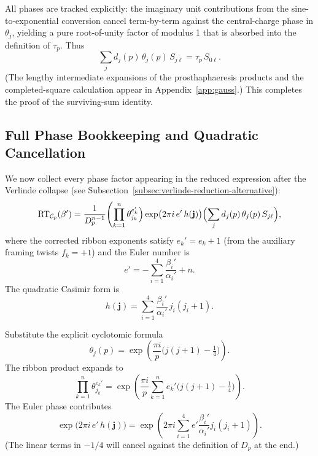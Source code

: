 All phases are tracked explicitly: the imaginary unit contributions from the sine-to-exponential conversion cancel term-by-term against the central-charge phase in \(\theta_j\), yielding a pure root-of-unity factor of modulus 1 that is absorbed into the definition of \(\tau_p\). Thus
\[
\sum_j d_j(p) \, \theta_j(p) \, S_{j\ell} = \tau_p \, S_{0\ell}.
\]
(The lengthy intermediate expansions of the prosthaphaeresis products and the completed-square calculation appear in Appendix~\ref{app:gauss}.) This completes the proof of the surviving-sum identity.

\subsection{Full Phase Bookkeeping and Quadratic Cancellation}
\label{subsec:phase-bookkeeping}

We now collect every phase factor appearing in the reduced expression after the Verlinde collapse (see Subsection~\ref{subsec:verlinde-reduction-alternative}):
\[
\mathrm{RT}_{\mathcal{C}_p}(\beta') = \frac{1}{D_p^{n-1}} \Biggl( \prod_{k=1}^n \theta_{j_k}^{e_k'} \Bigr) \exp\bigl(2\pi i \, e' \, h(\mathbf{j})\bigr) \Bigl( \sum_j d_j(p) \, \theta_j(p) \, S_{j\ell} \Bigr),
\]
where the corrected ribbon exponents satisfy \(e_k' = e_k + 1\) (from the auxiliary framing twists \(f_k = +1\)) and the Euler number is
\[
e' = -\sum_{i=1}^4 \frac{\beta_i'}{\alpha_i'} + n.
\]
The quadratic Casimir form is
\[
h(\mathbf{j}) = \sum_{i=1}^4 \frac{\beta_i'}{\alpha_i'} \, j_i(j_i+1).
\]

Substitute the explicit cyclotomic formula
\[
\theta_j(p) = \exp\left( \frac{\pi i}{p} \bigl( j(j+1) - \tfrac14 \bigr) \right).
\]
The ribbon product expands to
\[
\prod_{k=1}^n \theta_{j_k}^{e_k'} = \exp\left( \frac{\pi i}{p} \sum_{k=1}^n e_k' \bigl( j(j+1) - \tfrac14 \bigr) \right).
\]
The Euler phase contributes
\[
\exp\bigl(2\pi i \, e' \, h(\mathbf{j})\bigr) = \exp\left( 2\pi i \sum_{i=1}^4 e' \frac{\beta_i'}{\alpha_i'} j_i(j_i+1) \right).
\]
(The linear terms in \(-1/4\) will cancel against the definition of \(D_p\) at the end.)


